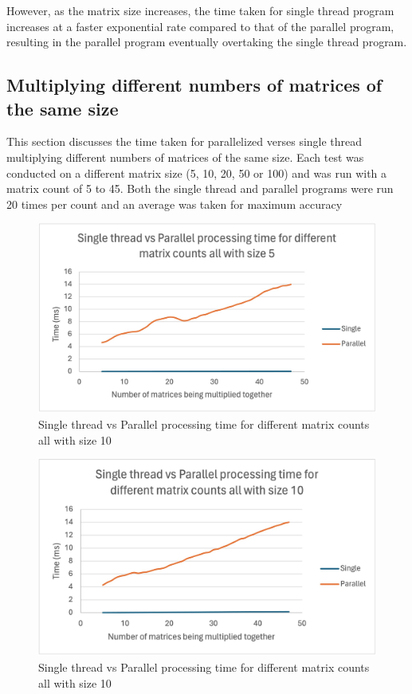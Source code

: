 However, as the matrix size increases, the time taken for single thread program increases at a faster exponential rate compared to that of the parallel program, resulting in the parallel program eventually overtaking the single thread program.

\subsection{Multiplying different numbers of matrices of the same size}
This section discusses the time taken for parallelized verses single thread multiplying different numbers of matrices of the same size.
Each test was conducted on a different matrix size (5, 10, 20, 50 or 100) and was run with a matrix count of 5 to 45.
Both the single thread and parallel programs were run 20 times per count and an average was taken for maximum accuracy

\begin{figure}[H]
    \centering
    \includegraphics[width=0.8\columnwidth]{Figures/different_matrix_counts_size_5}
    \caption{Single thread vs Parallel processing time for different matrix counts all with size 10}
    \label{fig:different_matrix_counts_size 5}
\end{figure}

\begin{figure}[H]
    \centering
    \includegraphics[width=0.8\columnwidth]{Figures/different_matrix_counts_size_10}
    \caption{Single thread vs Parallel processing time for different matrix counts all with size 10}
    \label{fig:different_matrix_counts_size 10}
\end{figure}

